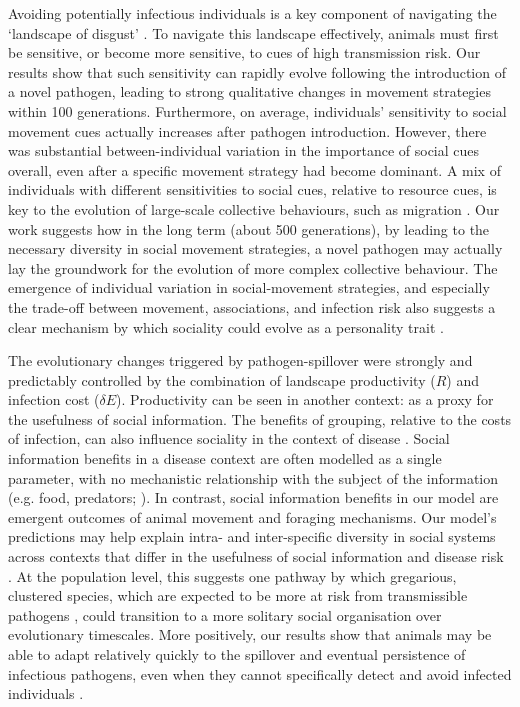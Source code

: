 Avoiding potentially infectious individuals is a key component of navigating the `landscape of disgust' \citep{weinstein2018}.
To navigate this landscape effectively, animals must first be sensitive, or become more sensitive, to cues of high transmission risk.
Our results show that such sensitivity can rapidly evolve following the introduction of a novel pathogen, leading to strong qualitative changes in movement strategies within 100 generations.
Furthermore, on average, individuals' sensitivity to social movement cues actually increases after pathogen introduction.
However, there was substantial between-individual variation in the importance of social cues overall, even after a specific movement strategy had become dominant.
A mix of individuals with different sensitivities to social cues, relative to resource cues, is key to the evolution of large-scale collective behaviours, such as migration \citep{guttal2010}.
Our work suggests how in the long term (about 500 generations), by leading to the necessary diversity in social movement strategies, a novel pathogen may actually lay the groundwork for the evolution of more complex collective behaviour.
The emergence of individual variation in social-movement strategies, and especially the trade-off between movement, associations, and infection risk also suggests a clear mechanism by which sociality could evolve as a personality trait \citep[][]{gartland2021}.

The evolutionary changes triggered by pathogen-spillover were strongly and predictably controlled by the combination of landscape productivity ($R$) and infection cost ($\delta E$).
Productivity can be seen in another context: as a proxy for the usefulness of social information.
The benefits of grouping, relative to the costs of infection, can also influence sociality in the context of disease \citep{almberg2015,ezenwa2016}.
Social information benefits in a disease context are often modelled as a single parameter, with no mechanistic relationship with the subject of the information (e.g. food, predators; \citealt{ashby2021}). 
In contrast, social information benefits in our model are emergent outcomes of animal movement and foraging mechanisms.
Our model's predictions may help explain intra- and inter-specific diversity in social systems across contexts that differ in the usefulness of social information and disease risk \citep{lott1991, sah2018}.
At the population level, this suggests one pathway by which gregarious, clustered species, which are expected to be more at risk from transmissible pathogens \citep{sah2018}, could transition to a more solitary social organisation over evolutionary timescales.
More positively, our results show that animals may be able to adapt relatively quickly to the spillover and eventual persistence of infectious pathogens, even when they cannot specifically detect and avoid infected individuals \citep{stroeymeyt2018}.

